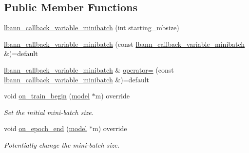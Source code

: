 \subsection*{Public Member Functions}
\begin{DoxyCompactItemize}
\item 
\hyperlink{classlbann_1_1lbann__callback__variable__minibatch_a970a03f0d297f8447020e85d23f5ee73}{lbann\+\_\+callback\+\_\+variable\+\_\+minibatch} (int starting\+\_\+mbsize)
\item 
\hyperlink{classlbann_1_1lbann__callback__variable__minibatch_a7ffbb380f1a58b164cfb49ab1b407648}{lbann\+\_\+callback\+\_\+variable\+\_\+minibatch} (const \hyperlink{classlbann_1_1lbann__callback__variable__minibatch}{lbann\+\_\+callback\+\_\+variable\+\_\+minibatch} \&)=default
\item 
\hyperlink{classlbann_1_1lbann__callback__variable__minibatch}{lbann\+\_\+callback\+\_\+variable\+\_\+minibatch} \& \hyperlink{classlbann_1_1lbann__callback__variable__minibatch_a154f749e29203562d41faf81202e5656}{operator=} (const \hyperlink{classlbann_1_1lbann__callback__variable__minibatch}{lbann\+\_\+callback\+\_\+variable\+\_\+minibatch} \&)=default
\item 
void \hyperlink{classlbann_1_1lbann__callback__variable__minibatch_a4f5d8ab04ab3e1cc3aa66327d3712f51}{on\+\_\+train\+\_\+begin} (\hyperlink{classlbann_1_1model}{model} $\ast$m) override
\begin{DoxyCompactList}\small\item\em Set the initial mini-\/batch size. \end{DoxyCompactList}\item 
void \hyperlink{classlbann_1_1lbann__callback__variable__minibatch_a091e7563b5a7a90638e2521fe39cbf8f}{on\+\_\+epoch\+\_\+end} (\hyperlink{classlbann_1_1model}{model} $\ast$m) override
\begin{DoxyCompactList}\small\item\em Potentially change the mini-\/batch size. \end{DoxyCompactList}\end{DoxyCompactItemize}

